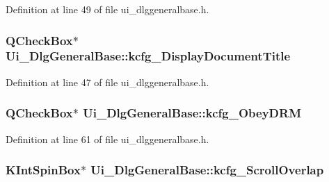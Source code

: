 Definition at line 49 of file ui\+\_\+dlggeneralbase.\+h.

\hypertarget{classUi__DlgGeneralBase_a0283039d02817b23b8f52f3b670bd9a8}{
\subsubsection[{kcfg\+\_\+\+Display\+Document\+Title}]{\setlength{\rightskip}{0pt plus 5cm}Q\+Check\+Box$\ast$ Ui\+\_\+\+Dlg\+General\+Base\+::kcfg\+\_\+\+Display\+Document\+Title}}\label{classUi__DlgGeneralBase_a0283039d02817b23b8f52f3b670bd9a8}


Definition at line 47 of file ui\+\_\+dlggeneralbase.\+h.

\hypertarget{classUi__DlgGeneralBase_ae06aa2913c5352f7291531fa8709216f}{
\subsubsection[{kcfg\+\_\+\+Obey\+D\+R\+M}]{\setlength{\rightskip}{0pt plus 5cm}Q\+Check\+Box$\ast$ Ui\+\_\+\+Dlg\+General\+Base\+::kcfg\+\_\+\+Obey\+D\+R\+M}}\label{classUi__DlgGeneralBase_ae06aa2913c5352f7291531fa8709216f}


Definition at line 61 of file ui\+\_\+dlggeneralbase.\+h.

\hypertarget{classUi__DlgGeneralBase_aa5ddc567f8fc39c1a159749c0c4bd718}{
\subsubsection[{kcfg\+\_\+\+Scroll\+Overlap}]{\setlength{\rightskip}{0pt plus 5cm}K\+Int\+Spin\+Box$\ast$ Ui\+\_\+\+Dlg\+General\+Base\+::kcfg\+\_\+\+Scroll\+Overlap}}\label{classUi__DlgGeneralBase_aa5ddc567f8fc39c1a159749c0c4bd718}


